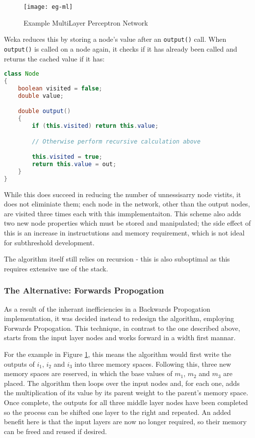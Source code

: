 \begin{figure}[!h]
    \centering
    \texttt{[image: eg-ml]}
    \caption{Example MultiLayer Perceptron Network}
    \label{fig:eg-ml}
\end{figure}

Weka reduces this by storing a node's value after an \verb|output()| call. When \verb|output()| is called on a node again, it checks if it has already been called and returns the cached value if it has:

\begin{lstlisting}[language=Java,caption={Weka's method of preventing repeated calculations}]
class Node
{
    boolean visited = false;
    double value;

    double output()
    {
        if (this.visited) return this.value;

        // Otherwise perform recursive calculation above

        this.visited = true;
        return this.value = out;
    }
}
\end{lstlisting}

While this does succeed in reducing the number of unnessisarry node vistits, it does not eliminiate them; each node in the network, other than the output nodes, are visited three times each with this immplementaiton. This scheme also adds two new node properties which must be stored and manipulated; the side effect of this is an increase in instructutions and memory requirement, which is not ideal for subthreshold development.

The algorithm itself still relies on recursion - this is also suboptimal as this requires extensive use of the stack.

\subsubsection{The Alternative: Forwards Propogation}

As a result of the inherant inefficiencies in a Backwards Propogation implementation, it was decided instead to redesign the algorithm, employing Forwards Propogation. This technique, in contrast to the one described above, starts from the input layer nodes and works forward in a width first mannar.

For the example in Figure \ref{fig:eg-ml}, this means the algorithm would first write the outputs of $i_1$, $i_2$ and $i_3$ into three memory spaces. Following this, three new memory spaces are reserved, in which the base values of $m_1$, $m_2$ and $m_3$ are placed. The algorithm then loops over the input nodes and, for each one, adds the multiplication of its value by its parent weight to the parent's memory space. Once complete, the outputs for all three middle layer nodes have been completed so the process can be shifted one layer to the right and repeated. An added benefit here is that the input layers are now no longer required, so their memory can be freed and reused if desired.

